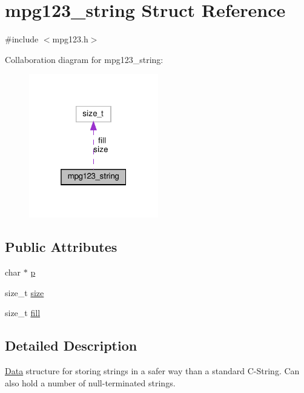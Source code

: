 \hypertarget{structmpg123__string}{}\section{mpg123\+\_\+string Struct Reference}
\label{structmpg123__string}


{\ttfamily \#include $<$mpg123.\+h$>$}



Collaboration diagram for mpg123\+\_\+string\+:
\nopagebreak
\begin{figure}[H]
\begin{center}
\leavevmode
\includegraphics[width=160pt]{structmpg123__string__coll__graph}
\end{center}
\end{figure}
\subsection*{Public Attributes}
\begin{DoxyCompactItemize}
\item 
char $\ast$ \hyperlink{structmpg123__string_a0ecd4db99ad8bfa7a95d66db47678d7e}{p}
\item 
size\+\_\+t \hyperlink{structmpg123__string_afa783be283e7e2f287f0b8a129701eba}{size}
\item 
size\+\_\+t \hyperlink{structmpg123__string_ab6a0704da4410a7e913fae5731284915}{fill}
\end{DoxyCompactItemize}


\subsection{Detailed Description}
\hyperlink{classData}{Data} structure for storing strings in a safer way than a standard C-\/\+String. Can also hold a number of null-\/terminated strings. 

